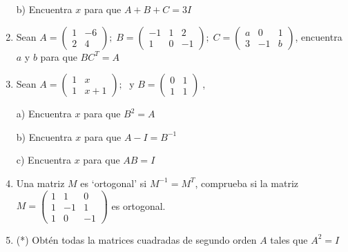 \begin{enumerate}
b) Encuentra $x$ para que $A+B+C=3I$

\rightline{\textcolor{gris}{Solución: $a)\; x=1, \quad b)\; x=0$}}

\item Sean $ A=\left( \begin{array}{cc} 1&-6\\2&4   \end{array} \right); \;
 B=\left( \begin{array}{ccc} -1&1&2\\1&0&-1  \end{array}\right); \;
C=\left( \begin{array}{ccc} a&0&1\\3&-1&b   \end{array} \right)$,  encuentra
$a$ y $b$ para que $BC^T=A$

\rightline{\textcolor{gris}{Solución: $a=3; \; b=-1$}}

\item Sean $ A=\left( \begin{array}{cc} 1&x\\1&x+1   \end{array} \right); \;
\text { y } B=\left( \begin{array}{cc} 0&1\\1&1  \end{array}\right)\;$, 

a) Encuentra $x$ para que $B^2=A$

b) Encuentra $x$ para que $A-I=B^{-1}$

c) Encuentra $x$ para que $AB=I$

\rightline{\textcolor{gris}{Solución: $a)\; x=1, \quad b)\; x=0, \quad c)\; x=-1$}}







	
\item Una matriz $M$ es `ortogonal' si $M^{-1}=M^T$, comprueba si la matriz $M=\left( \begin{matrix} 1&1&0\\1&-1&1\\1&0&-1  \end{matrix}\right)$ es ortogonal.

\rightline{\textcolor{gris}{Solución: No   }}

\item (*) Obtén todas la matrices cuadradas de segundo orden $A$ tales que $A^2=I$


\end{enumerate}
